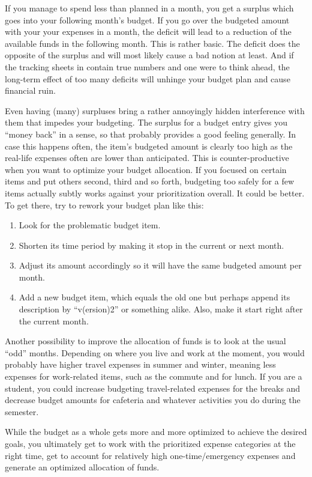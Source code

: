 If you manage to spend less than planned in a month, you get a surplus which goes into your following month's budget.
If you go over the budgeted amount with your your expenses in a month, the deficit will lead to a reduction of the available funds in the following month.
This is rather basic.
The deficit does the opposite of the surplus and will most likely cause a bad notion at least.
And if the tracking sheets in \tfn contain true numbers and one were to think ahead, the long-term effect of too many deficits will unhinge your budget plan and cause financial ruin.

Even having (many) surpluses bring a rather annoyingly hidden interference with them that impedes your budgeting.
The surplus for a budget entry gives you ``money back'' in a sense, so that probably provides a good feeling generally.
In case this happens often, the item's budgeted amount is clearly too high as the real-life expenses often are lower than anticipated.
This is counter-productive when you want to optimize your budget allocation.
If you focused on certain items and put others second, third and so forth, budgeting too safely for a few items actually subtly works against your prioritization overall.
It could be better.
To get there, try to rework your budget plan like this:
\begin{enumerate}
	\item Look for the problematic budget item.
	\item Shorten its time period by making it stop in the current or next month.
	\item Adjust its amount accordingly so it will have the same budgeted amount per month.
	\item Add a new budget item, which equals the old one but perhaps append its description by ``v(ersion)2'' or something alike.
	Also, make it start right after the current month.
\end{enumerate}

Another possibility to improve the allocation of funds is to look at the usual ``odd'' months.
Depending on where you live and work at the moment, you would probably have higher travel expenses in summer and winter, meaning less expenses for work-related items, such as the commute and for lunch.
If you are a student, you could increase budgeting travel-related expenses for the breaks and decrease budget amounts for cafeteria and whatever activities you do during the semester.

While the budget as a whole gets more and more optimized to achieve the desired goals, you ultimately get to work with the prioritized expense categories at the right time, get to account for relatively high one-time/emergency expenses and generate an optimized allocation of funds.

